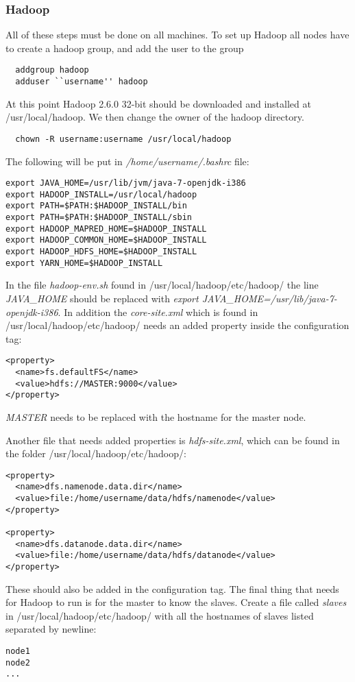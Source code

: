 \subsubsection*{Hadoop}
All of these steps must be done on all machines. To set up Hadoop all nodes have to create a hadoop group, and add the user to the group
\begin{lstlisting}
  addgroup hadoop
  adduser ``username'' hadoop
\end{lstlisting}
At this point Hadoop 2.6.0 32-bit should be downloaded and installed at \textsf{/usr/local/hadoop}. We then change the owner of the hadoop directory.
\begin{lstlisting}
  chown -R username:username /usr/local/hadoop
\end{lstlisting}
The following will be put in \emph{/home/username/.bashrc} file:
\begin{verbatim}
export JAVA_HOME=/usr/lib/jvm/java-7-openjdk-i386
export HADOOP_INSTALL=/usr/local/hadoop
export PATH=$PATH:$HADOOP_INSTALL/bin
export PATH=$PATH:$HADOOP_INSTALL/sbin
export HADOOP_MAPRED_HOME=$HADOOP_INSTALL
export HADOOP_COMMON_HOME=$HADOOP_INSTALL
export HADOOP_HDFS_HOME=$HADOOP_INSTALL
export YARN_HOME=$HADOOP_INSTALL
\end{verbatim}
In the file \emph{hadoop-env.sh} found in \textsf{/usr/local/hadoop/etc/hadoop/} the line \emph{JAVA\_HOME} should be replaced with \emph{export JAVA\_HOME=/usr/lib/java-7-openjdk-i386}.
In addition the \emph{core-site.xml} which is found in \textsf{/usr/local/hadoop/etc/hadoop/} needs an added property inside the configuration tag: 
\begin{verbatim}
<property>
  <name>fs.defaultFS</name>
  <value>hdfs://MASTER:9000</value>
</property>
\end{verbatim}
\emph{MASTER} needs to be replaced with the hostname for the master node.

Another file that needs added properties is \emph{hdfs-site.xml}, which can be found in the folder \textsf{/usr/local/hadoop/etc/hadoop/}:
\begin{verbatim}
<property>
  <name>dfs.namenode.data.dir</name>
  <value>file:/home/username/data/hdfs/namenode</value>
</property>

<property>
  <name>dfs.datanode.data.dir</name>
  <value>file:/home/username/data/hdfs/datanode</value>
</property>
\end{verbatim}
These should also be added in the configuration tag.
The final thing that needs for Hadoop to run is for the master to know the slaves. Create a file called \emph{slaves} in \textsf{/usr/local/hadoop/etc/hadoop/} with all the hostnames of slaves listed separated by newline:
\begin{verbatim}
node1
node2
...
\end{verbatim}

